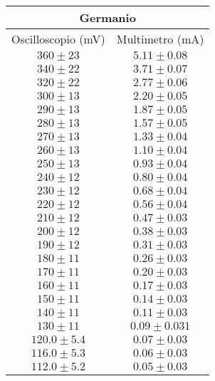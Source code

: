 \documentclass[@MAIN@]{subfile}
\begin{document}
    \begin{tabular}{ ||c|c|| }
        \hline
        \multicolumn{2}{||c||}{Germanio} \\
        \hline
        Oscilloscopio (mV) & Multimetro (mA) \\
        \hline
        $360\pm 23$        & $5.11\pm 0.08$  \\
        \hline
        $340\pm 22$        & $3.71\pm 0.07$  \\
        \hline
        $320\pm 22$        & $2.77\pm 0.06$  \\
        \hline
        $300\pm 13$        & $2.20\pm 0.05$  \\
        \hline
        $290\pm 13$        & $1.87\pm 0.05$  \\
        \hline
        $280\pm 13$        & $1.57\pm 0.05$  \\
        \hline
        $270\pm 13$        & $1.33\pm 0.04$  \\
        \hline
        $260\pm 13$        & $1.10\pm 0.04$  \\
        \hline
        $250\pm 13$        & $0.93\pm 0.04$  \\
        \hline
        $240\pm 12$        & $0.80\pm 0.04$  \\
        \hline
        $230\pm 12$        & $0.68\pm 0.04$  \\
        \hline
        $220\pm 12$        & $0.56\pm 0.04$  \\
        \hline
        $210\pm 12$        & $0.47\pm 0.03$  \\
        \hline
        $200\pm 12$        & $0.38\pm 0.03$  \\
        \hline
        $190\pm 12$        & $0.31\pm 0.03$  \\
        \hline
        $180\pm 11$        & $0.26\pm 0.03$  \\
        \hline
        $170\pm 11$        & $0.20\pm 0.03$  \\
        \hline
        $160\pm 11$        & $0.17\pm 0.03$  \\
        \hline
        $150\pm 11$        & $0.14\pm 0.03$  \\
        \hline
        $140\pm 11$        & $0.11\pm 0.03$  \\
        \hline
        $130\pm 11$        & $0.09\pm 0.031$ \\
        \hline
        $120.0\pm 5.4$     & $0.07\pm 0.03$  \\
        \hline
        $116.0\pm 5.3$     & $0.06\pm 0.03$  \\
        \hline
        $112.0\pm 5.2$     & $0.05\pm 0.03$  \\
        \hline

    \end{tabular}
\end{document}
